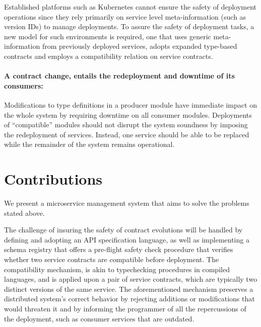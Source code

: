 Established platforms such as Kubernetes cannot ensure the safety of deployment operations since they rely primarily on service level meta-information (such as version IDs) to manage deployments.
To assure the safety of deployment tasks, a new model for such environments is required,
one that uses generic meta-information from previously deployed services, adopts expanded type-based contracts and employs a compatibility relation on service contracts.

\paragraph{A contract change, entails the redeployment and downtime of its consumers:}

Modifications to type definitions in a producer module have immediate
impact on the whole system by requiring downtime on all consumer modules.
Deployments of “compatible” modules should not disrupt the system soundness by imposing the redeployment of services.
Instead, one service should be able to be replaced while the remainder of the system remains operational.

\section{Contributions} %
\label{sec:contributions}

We present a microservice management system that aims to solve the problems stated above.

The challenge of insuring the safety of contract evolutions will be handled by defining and adopting an API specification language, as well as implementing a schema
registry that offers a pre-flight safety check procedure that verifies whether two service contracts are compatible before
deployment. The compatibility mechanism, is akin to typechecking procedures in compiled languages, and is applied upon a
pair of service contracts, which are typically two distinct versions of the same service. The aforementioned mechanism preserves
a distributed system's correct behavior by rejecting additions or modifications that would threaten it and by informing the programmer
of all the repercussions of the deployment, such as consumer services that are outdated.

